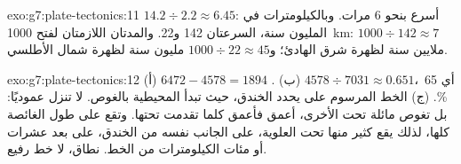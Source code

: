 \begin{solution}{exo:g7:plate-tectonics:11}
$14.2 \div 2.2 \approx 6.45$: أسرع بنحو 6 مرات.
وبالكيلومترات في المليون سنة، السرعتان 142 و22. والمدتان اللازمتان لفتح
\qty{1000}{km}: $1000 \div 142 \approx 7$ ملايين سنة لظهرة شرق
 الهادئ؛ و$1000 \div 22 \approx 45$ مليون سنة لظهرة شمال
الأطلسي.
\end{solution}

\begin{solution}{exo:g7:plate-tectonics:12}
(أ) $6472 - 4578 = 1894$ . (ب) $4578 \div 7031 \approx 0.651$،
أي 65\,\%. (ج) الخط المرسوم على  يحدد الخندق، حيث تبدأ  المحيطية
بالغوص.  لا تنزل عموديًا: بل تغوص
مائلة تحت  الأخرى، أعمق فأعمق كلما تقدمت تحتها.
وتقع  على طول  الغائصة كلها، لذلك يقع كثير منها تحت
 العلوية، على الجانب نفسه من الخندق، على بعد عشرات أو مئات
الكيلومترات من الخط.  نطاق، لا خط رفيع.
\end{solution}

